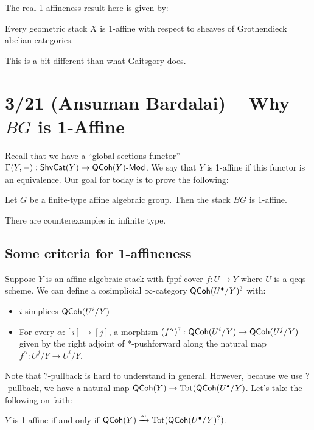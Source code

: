 \documentclass{article}
\begin{document}
The real 1-affineness result here is given by:

\begin{thm}[Stefanich]
	Every geometric stack $X$ is 1-affine with respect to sheaves of Grothendieck abelian categories.
\end{thm}

This is a bit different than what Gaitsgory does.

\section{3/21 (Ansuman Bardalai) -- Why $BG$ is 1-Affine}

Recall that we have a ``global sections functor'' $\Gamma(Y, -): \mathsf{ShvCat}(Y) \to \mathsf{QCoh}(Y)\text{-}\mathsf{Mod}$.
We say that $Y$ is 1-affine if this functor is an equivalence.
Our goal for today is to prove the following:

\begin{thm}
	Let $G$ be a finite-type affine algebraic group.
	Then the stack $BG$ is 1-affine.
\end{thm}

\begin{rmk}
	There are counterexamples in infinite type.
\end{rmk}

\subsection{Some criteria for 1-affineness}

Suppose $Y$ is an affine algebraic stack with fppf cover $f: U \to Y$ where $U$ is a qcqs scheme.
We can define a cosimplicial $\infty$-category $\mathsf{QCoh}(U^\bullet/Y)^?$ with:
\begin{itemize}
	\item $i$-simplices $\mathsf{QCoh}(U^i / Y)$
	\item For every $\alpha: [i] \to [j]$, a morphism $(f^\alpha)^?: \mathsf{QCoh}(U^i / Y) \to \mathsf{QCoh}(U^j / Y)$ given by the right adjoint of $*$-pushforward along the natural map $f^\alpha: U^j / Y \to U^i / Y$.
\end{itemize}

Note that $?$-pullback is hard to understand in general.
However, because we use $?$-pullback, we have a natural map $\mathsf{QCoh}(Y) \to \operatorname{Tot}(\mathsf{QCoh}(U^\bullet / Y)$.
Let's take the following on faith:

\begin{thm}[6.2.7d in Gaitsgory]
	$Y$ is 1-affine if and only if $\mathsf{QCoh}(Y) \xrightarrow{\sim} \operatorname{Tot}(\mathsf{QCoh}(U^\bullet / Y)^?)$.
\end{thm}
\end{document}
